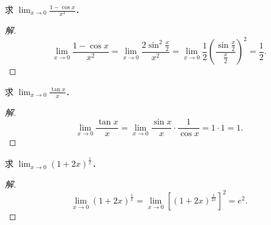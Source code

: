 \begin{example}\label{ex:3-3-11}
求 $\lim_{x \to 0} \frac{1 - \cos x}{x^2}$．
\end{example}

\begin{proof}[解]
\[
\lim_{x \to 0} \frac{1 - \cos x}{x^2} = \lim_{x \to 0} \frac{2\sin^2\frac{x}{2}}{x^2} = \lim_{x \to 0} \frac{1}{2}\left(\frac{\sin\frac{x}{2}}{\frac{x}{2}}\right)^2 = \frac{1}{2}.
\]
\end{proof}

\begin{example}\label{ex:3-3-12}
求 $\lim_{x \to 0} \frac{\tan x}{x}$．
\end{example}

\begin{proof}[解]
\[
\lim_{x \to 0} \frac{\tan x}{x} = \lim_{x \to 0} \frac{\sin x}{x} \cdot \frac{1}{\cos x} = 1 \cdot 1 = 1.
\]
\end{proof}

\begin{example}\label{ex:3-3-13}
求 $\lim_{x \to 0} (1 + 2x)^{\frac{1}{x}}$．
\end{example}

\begin{proof}[解]
\[
\lim_{x \to 0} (1 + 2x)^{\frac{1}{x}} = \lim_{x \to 0} \left[(1 + 2x)^{\frac{1}{2x}}\right]^2 = e^2.
\]
\end{proof}

